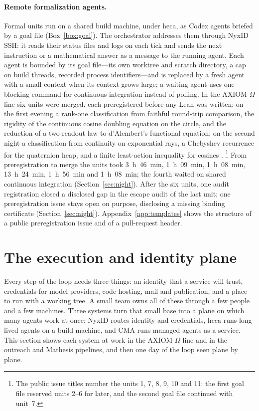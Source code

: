 \documentclass[11pt]{article}
\begin{document}
\paragraph{Remote formalization agents.} Formal units run on a shared build
machine, under heca, as Codex agents briefed by a goal file
(Box~\ref{box:goal}). The orchestrator addresses them through NyxID SSH: it
reads their status files and logs on each tick and sends the next instruction
or a mathematical answer as a message to the running agent. Each agent is
bounded by its goal file---its own worktree and scratch directory, a cap on
build threads, recorded process identifiers---and is replaced by a fresh
agent with a small context when its context grows large; a waiting agent uses
one blocking command for continuous integration instead of polling. In the
AXIOM-$\Omega$ line six units were merged, each preregistered before any
Lean was written: on the first evening a rank-one classification from
faithful round-trip comparison, the rigidity of the continuous cosine
doubling equation on the circle, and the reduction of a two-readout law to
d'Alembert's functional equation; on the second night a classification from
continuity on exponential rays, a Chebyshev recurrence for the quaternion
heap, and a finite least-action inequality for cosines
\citep{prereg31739,axiomprs}.%
\footnote{The public issue titles number the units 1, 7, 8, 9, 10 and 11:
the first goal file reserved units 2--6 for later, and the second goal file
continued with unit~7.} From preregistration to merge the units took
3~h~46~min, 1~h~09~min, 1~h~08~min, 13~h~24~min, 1~h~56~min and 1~h~08~min;
the fourth waited on shared continuous integration (Section~\ref{sec:night}).
After the six units, one audit registration closed a disclosed gap in the
escape audit of the last unit; one preregistration issue stays open on
purpose, disclosing a missing binding certificate (Section~\ref{sec:night}). Appendix~\ref{app:templates} shows the structure of a public
preregistration issue and of a pull-request header.

\section{The execution and identity plane}
\label{sec:plane}
Every step of the loop needs three things: an identity that a service will
trust, credentials for model providers, code hosting, mail and publication,
and a place to run with a working tree. A small team owns all of these
through a few people and a few machines. Three systems turn that small base
into a plane on which many agents work at once: NyxID routes identity and
credentials, heca runs long-lived agents on a build machine, and CMA runs
managed agents as a service. This section shows each system at work in the
AXIOM-$\Omega$ line and in the outreach and Mathesis pipelines, and then one
day of the loop seen plane by plane.
\end{document}
